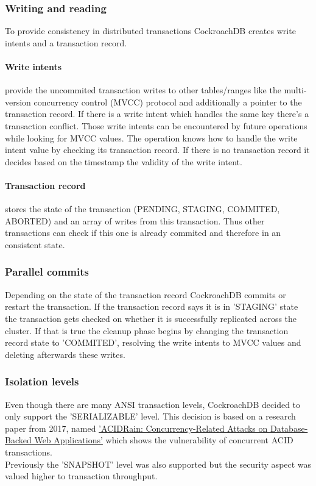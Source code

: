 \subsubsection{Writing and reading}
To provide consistency in distributed transactions CockroachDB creates write intents and a transaction record.

\paragraph{Write intents} provide the uncommited transaction writes to other tables/ranges like the multi-version concurrency 
control (MVCC) protocol and additionally a pointer to the transaction record. If there is a write intent which handles the
same key there's a transaction conflict. Those write intents can be encountered by future operations while looking for 
MVCC values. The operation knows how to handle the write intent value by checking its transaction record. If there is no 
transaction record it decides based on the timestamp the validity of the write intent.

\paragraph{Transaction record} stores the state of the transaction (PENDING, STAGING, COMMITED, ABORTED) and an array of
writes from this transaction. Thus other transactions can check if this one is already commited and therefore in an
consistent state.

\subsubsection{Parallel commits}
Depending on the state of the transaction record CockroachDB commits or restart the transaction. If the transaction record
says it is in 'STAGING' state the transaction gets checked on whether it is successfully replicated across the cluster. 
If that is true the cleanup phase begins by changing the transaction record state to 'COMMITED', resolving the write intents 
to MVCC values and deleting afterwards these writes.

\subsubsection{Isolation levels}
Even though there are many ANSI transaction levels, CockroachDB decided to only support the 'SERIALIZABLE' level.
This decision is based on a research paper from 2017, named \href{http://www.bailis.org/papers/acidrain-sigmod2017.pdf}
{'ACIDRain: Concurrency-Related Attacks on Database-Backed Web Applications'}\cite{acid-rain-paper} which shows the vulnerability of concurrent 
ACID transactions.\\
Previously the 'SNAPSHOT' level was also supported but the security aspect was valued higher to transaction throughput.

